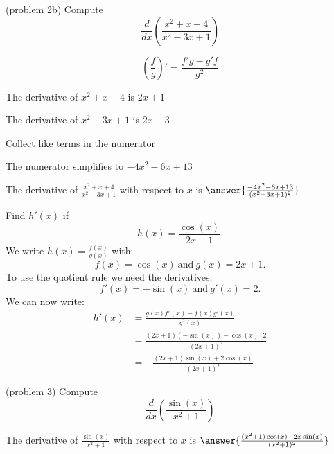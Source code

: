 \documentclass[handout]{ximera}
\begin{document}
\begin{problem}(problem 2b)
  Compute
  \[
  \frac{d}{dx} \left(\frac{x^2 + x + 4}{x^2 -3x + 1}\right)
  \]
  
    \begin{hint}
      \[\left(\frac{f}{g}\right)' = \frac{f'g-g'f}{g^2}\]
    \end{hint}
    \begin{hint}
      The derivative of $x^2 + x + 4$ is $2x+1$
    \end{hint}
    \begin{hint}
      The derivative of $x^2 -3x + 1$ is $2x-3$
    \end{hint}
    \begin{hint}
      Collect like terms in the numerator
    \end{hint}
		\begin{hint}
      The numerator simplifies to $-4x^2 -6x +13$
    \end{hint}
		The derivative of $\frac{x^2 + x + 4}{x^2 -3x + 1}$ with respect to $x$ is
		 $\answer{\frac{-4x^2 -6x +13}{(x^2 -3x + 1)^2}}$
		
\end{problem}



\begin{example}[example 3]
Find $h'(x)$ if 
\[
h(x) = \frac{\cos(x)}{2x+1}.
\]
We write $\displaystyle{h(x) = \frac{f(x)}{g(x)}}$ 
with: 
\[f(x) = \cos(x) \ \text{and} \  g(x)= 2x+1.\]
To use the quotient rule we need the derivatives:
\[f'(x) = -\sin(x) \ \text{and} \  g'(x) = 2.\]
We can now write: 
\begin{align*}
h'(x) &= \frac{g(x)f'(x) - f(x)g'(x)}{g^2(x)}\\
&= \frac{(2x+1)(-\sin(x))- \cos(x)\cdot 2}{(2x+1)^2}\\
&= -\frac{(2x+1)\sin(x) + 2\cos(x)}{(2x+1)^2}
\end{align*}
\end{example}



\begin{center}
\begin{foldable}
\end{foldable}
\end{center}


\begin{problem}(problem 3)
  Compute
  \[
  \frac{d}{dx} \left(\frac{\sin(x)}{x^2 + 1}\right)
  \]
  
		The derivative of $\frac{\sin(x)}{x^2 + 1}$ with respect to $x$ is
		 $\answer{\frac{(x^2 + 1)\cos(x) - 2x\sin(x)}{(x^2 + 1)^2}}$
		
\end{problem}
\end{document}
